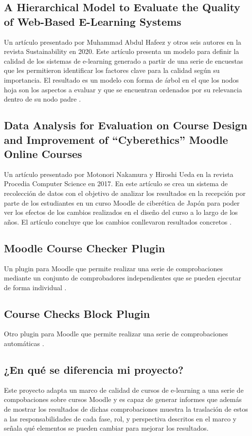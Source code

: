 \subsection{A Hierarchical Model to Evaluate the Quality of Web-Based E-Learning Systems}
Un artículo presentado por Muhammad Abdul Hafeez y otros seis autores en la revista Sustainability en 2020.
Este artículo presenta un modelo para definir la calidad de los sistemas de e-learning generado a partir de una serie de encuestas que les permitieron identificar los factores clave para la calidad según su importancia. El resultado es un modelo con forma de árbol en el que los nodos hoja son los aspectos a evaluar y que se encuentran ordenados por su relevancia dentro de su nodo padre \cite{muhammad2020hierarchical}.

\subsection{Data Analysis for Evaluation on Course Design and Improvement of “Cyberethics” Moodle Online Courses}
Un artículo presentado por Motonori Nakamura y Hiroshi Ueda en la revista Procedia Computer Science en 2017.
En este artículo se crea un sistema de recolección de datos con el objetivo de analizar los resultados en la recepción por parte de los estudiantes en un curso Moodle de ciberética de Japón para poder ver los efectos de los cambios realizados en el diseño del curso a lo largo de los años. El artículo concluye que los cambios conllevaron resultados concretos \cite{ueda2017data}.


\subsection{Moodle Course Checker Plugin}
Un plugin para Moodle que permite realizar una serie de comprobaciones mediante un conjunto de comprobadores independientes que se pueden ejecutar de forma individual \cite{coursechecker-2021}.

\subsection{Course Checks Block Plugin}
Otro plugin para Moodle que permite realizar una serie de comprobaciones automáticas \cite{coursechecksblock-2018}.

\subsection{¿En qué se diferencia mi proyecto?}
Este proyecto adapta un marco de calidad de cursos de e-learning a una serie de compobaciones sobre cursos Moodle y es capaz de generar informes que además de mostrar los resultados de dichas comprobaciones muestra la traslación de estos a las responsabilidades de cada fase, rol, y perspectiva descritos en el marco y señala qué elementos se pueden cambiar para mejorar los resultados.

